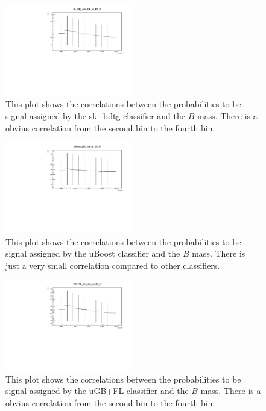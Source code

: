 \documentclass[english]{uzhpub}
\begin{document}
 \begin{figure}[H]
  \centering
  \includegraphics[width=0.5\textwidth]{plots/sk_bdtg_plot_bdt_vs_B0_M}
  \caption{This plot shows the correlations between the probabilities to be signal assigned by the sk\_bdtg classifier and the $B$ mass. There is a obvius correlation from the second bin to the fourth bin.}
  \label{fig:skbdtgB0M}
 \end{figure}

 \begin{figure}[H]
  \centering
  \includegraphics[width=0.5\textwidth]{plots/uBoost_plot_bdt_vs_B0_M}
  \caption{This plot shows the correlations between the probabilities to be signal assigned by the uBoost classifier and the $B$ mass. There is just a very small correlation compared to other classifiers.}
  \label{fig:uBoostB0M}
 \end{figure}

 \begin{figure}[H]
  \centering
  \includegraphics[width=0.5\textwidth]{plots/uGB+FL_plot_bdt_vs_B0_M}
  \caption{This plot shows the correlations between the probabilities to be signal assigned by the uGB+FL classifier and the $B$ mass. There is a obvius correlation from the second bin to the fourth bin.}
  \label{fig:uGB+FLB0M}
 \end{figure}
\end{document}
